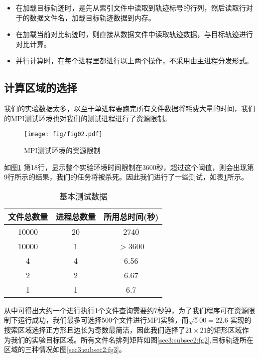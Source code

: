 \documentclass[UTF8]{ctexart}
\begin{document}
\begin{itemize}
	\item 在加载目标轨迹时，是先从索引文件中读取到轨迹标号的行列，然后读取行对于的数据文件名，加载目标轨迹数据到内存。
	\item 在加载当前对比轨迹时，则直接从数据文件中读取轨迹数据，与目标轨迹进行对比计算。
	\item 并行计算时，在每个进程里都进行以上两个操作，不采用由主进程分发形式。
\end{itemize}

\subsection{计算区域的选择}
\label{sec3:subsec2}
我们的实验数据太多，以至于单进程要跑完所有文件数据将耗费大量的时间，我们的MPI测试环境也对我们的测试进程进行了资源限制。

\begin{figure}[!htbp]
  \centering
  \texttt{[image: fig/fig02.pdf]}\\
  \caption{MPI测试环境的资源限制}
  \label{sec3:subsec2:fg1}
\end{figure}

如图\ref{sec3:subsec2:fg1}
第18行，显示整个实验环境时间限制在3600秒，超过这个阈值，则会出现第9行所示的结果，我们的任务将被杀死。因此我们进行了一些测试，如表\ref{sec3:subsec2:tb1}所示。

\begin{table}[!htbp]
  \centering
  \caption{基本测试数据}\label{sec3:subsec2:tb1}
  \begin{tabular}{c|c|c}
    \hline
    文件总数量 & 进程总数量  & 所用总时间(秒) \\
    \hline
    10000 & 20 & 2740 \\
    \hline
    10000 & 1 & $>$3600 \\
    \hline
    4 & 4 & 6.56 \\
    \hline
    2 & 2 & 6.67 \\
    \hline
    1 & 1 & 6.7 \\
    \hline
  \end{tabular}
\end{table}

从中可得出大约一个进行执行1个文件查询需要约7秒钟，为了我们程序可在资源限制下运行成功，我们最多可选择500个文件进行MPI实验，而$\surd500=22.6$
实现的搜索区域选择正方形且边长为奇数最简洁，因此我们选择了$21\times21$的矩形区域作为我们的实验目标区域。所有文件名排列矩阵如图\ref{sec3:subsec2:fg2},目标轨迹所在区域的三种情况如图\ref{sec3:subsec2:fg3}。
\end{document}
